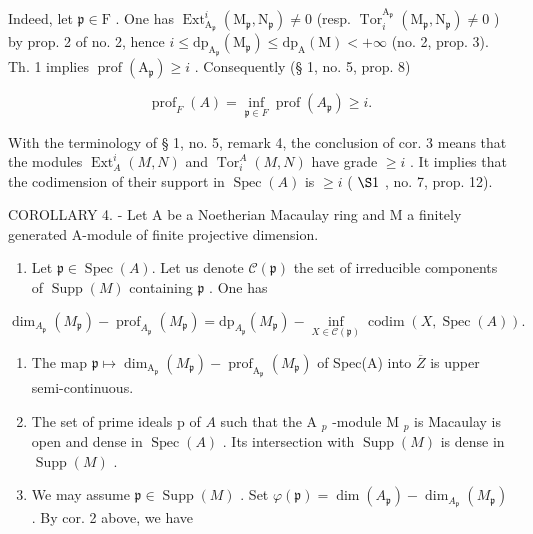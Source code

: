 Indeed, let \(\mathfrak{p} \in \mathrm{F}\) . One has \(\operatorname{Ext}_{\mathrm{A}_{\mathfrak{p}}}^{i}(\mathrm{M}_{\mathfrak{p}}, \mathrm{N}_{\mathfrak{p}}) \neq 0\) (resp. \(\operatorname{Tor}_{i}^{\mathrm{A}_{\mathfrak{p}}}(\mathrm{M}_{\mathfrak{p}}, \mathrm{N}_{\mathfrak{p}}) \neq 0\) ) by prop. 2 of no. 2, hence \(i \leqslant \mathrm{dp}_{\mathrm{A}_{\mathfrak{p}}}(\mathrm{M}_{\mathfrak{p}}) \leqslant \mathrm{dp}_{\mathrm{A}}(\mathrm{M}) < +\infty\) (no. 2, prop. 3). Th. 1 implies \(\operatorname{prof}(\mathrm{A}_{\mathfrak{p}}) \geqslant i\) . Consequently (§ 1, no. 5, prop. 8)

\[
\operatorname{prof} _ {F} (A) = \inf _ {\mathfrak {p} \in F} \operatorname{prof} (A _ {\mathfrak {p}}) \geqslant i.
\]

With the terminology of § 1, no. 5, remark 4, the conclusion of cor. 3 means that the modules \(\operatorname{Ext}_{A}^{i}(M,N)\) and \(\operatorname{Tor}_{i}^{A}(M,N)\) have grade \(\geqslant i\) . It implies that the codimension of their support in \(\operatorname{Spec}(A)\) is \(\geqslant i\) ( \(\S 1\) , no. 7, prop. 12).

COROLLARY 4. - Let A be a Noetherian Macaulay ring and M a finitely generated A-module of finite projective dimension.

\begin{enumerate}
\def\labelenumi{\alph{enumi})}
\tightlist
\item
  Let \(\mathfrak{p} \in \operatorname{Spec}(A)\). Let us denote \(\mathcal{C}(\mathfrak{p})\) the set of irreducible components of \(\operatorname{Supp}(M)\) containing \(\mathfrak{p}\) . One has
\end{enumerate}

\[
\dim_ {A _ {\mathfrak {p}}} \left(M _ {\mathfrak {p}}\right) - \operatorname{prof} _ {A _ {\mathfrak {p}}} \left(M _ {\mathfrak {p}}\right) = \mathrm{dp} _ {A _ {\mathfrak {p}}} \left(M _ {\mathfrak {p}}\right) - \inf _ {X \in \mathscr {C} (\mathfrak {p})} \operatorname{codim} (X, \operatorname{Spec} (A)).
\]

\begin{enumerate}
\def\labelenumi{\alph{enumi})}
\setcounter{enumi}{1}
\item
  The map \(\mathfrak{p}\mapsto\dim_{\mathrm{A}_{\mathfrak{p}}}(M_{\mathfrak{p}})-\operatorname{prof}_{\mathrm{A}_{\mathfrak{p}}}(M_{\mathfrak{p}})\) of Spec(A) into \(\overline{Z}\) is upper semi-continuous.
\item
  The set of prime ideals p of \(A\) such that the A \(_{p}\) -module M \(_{p}\) is Macaulay is open and dense in \(\operatorname{Spec}(A)\) . Its intersection with \(\operatorname{Supp}(M)\) is dense in \(\operatorname{Supp}(M)\) .
\item
  We may assume \(\mathfrak{p} \in \operatorname{Supp}(M)\) . Set \(\varphi(\mathfrak{p}) = \dim(A_{\mathfrak{p}}) - \dim_{A_{\mathfrak{p}}}(M_{\mathfrak{p}})\) . By cor. 2 above, we have
\end{enumerate}

